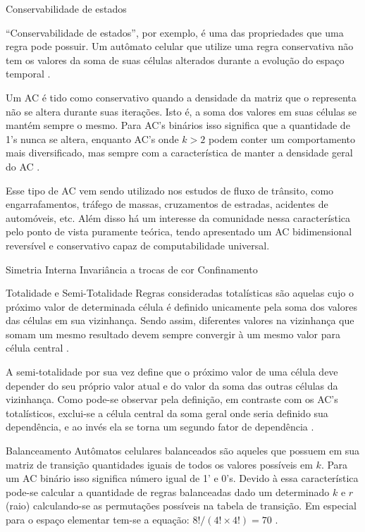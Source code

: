 	Conservabilidade de estados

``Conservabilidade de estados'', por exemplo, é uma das propriedades que uma regra pode possuir. Um autômato celular que utilize uma regra conservativa não tem os valores da soma de suas células alterados durante a evolução do espaço temporal \cite{zorandir2016}.

Um AC é tido como conservativo quando a densidade da matriz que o representa não se altera durante suas iterações. Isto é, a soma dos valores em suas células se mantém sempre o mesmo. Para AC's binários isso significa que a quantidade de 1's nunca se altera, enquanto AC's onde $k > 2$ podem conter um comportamento mais diversificado, mas sempre com a característica de manter a densidade geral do AC \cite{durand2002}.

Esse tipo de AC vem sendo utilizado nos estudos de fluxo de trânsito, como engarrafamentos, tráfego de massas, cruzamentos de estradas, acidentes de automóveis, etc. Além disso há um interesse da comunidade nessa característica pelo ponto de vista puramente teórica, tendo  apresentado um AC bidimensional reversível e conservativo capaz de computabilidade universal.
	
	Simetria Interna
	Invariância a trocas de cor
	Confinamento
	
	Totalidade e Semi-Totalidade
Regras consideradas totalísticas são aquelas cujo o próximo valor de determinada célula é definido unicamente pela soma dos valores das células em sua vizinhança. Sendo assim, diferentes valores na vizinhança que somam um mesmo resultado devem sempre convergir à um mesmo valor para célula central \cite{wolfram1985}.

A semi-totalidade por sua vez define que o próximo valor de uma célula deve depender do seu próprio valor atual e do valor da soma das outras células da vizinhança. Como pode-se observar pela definição, em contraste com os AC's totalísticos, exclui-se a célula central da soma geral onde seria definido sua dependência, e ao invés ela se torna um segundo fator de dependência \cite{wolfram1985}.
	
	Balanceamento
Autômatos celulares balanceados são aqueles que possuem em sua matriz de transição quantidades iguais de todos os valores possíveis em $k$. Para um AC binário isso significa número igual de 1' e 0's. Devido à essa característica pode-se calcular a quantidade de regras balanceadas dado um determinado $k$ e $r$ (raio) calculando-se as permutações possíveis na tabela de transição. Em especial para o espaço elementar tem-se a equação: $8!/(4!×4!) =70$ \cite{kronemberger2011}.

